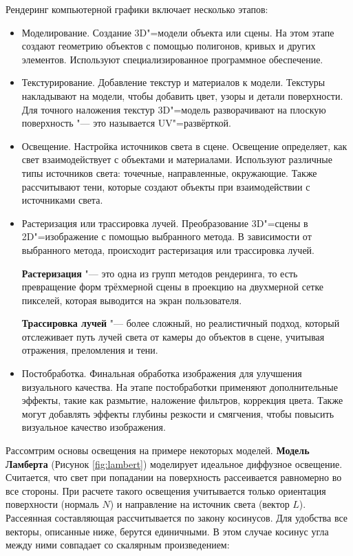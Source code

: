 Рендеринг компьютерной графики включает несколько этапов: 
\begin{itemize}
    \item Моделирование. Создание 3D"=модели объекта или сцены. На этом этапе создают геометрию объектов с помощью полигонов, кривых и других элементов. Используют специализированное программное обеспечение.  
    \item Текстурирование. Добавление текстур и материалов к модели. Текстуры накладывают на модели, чтобы добавить цвет, узоры и детали поверхности. Для точного наложения текстур 3D"=модель разворачивают на плоскую поверхность "--- это называется UV"=развёрткой.
    \item Освещение. Настройка источников света в сцене.  Освещение определяет, как свет взаимодействует с объектами и материалами. Используют различные типы источников света: точечные, направленные, окружающие. Также рассчитывают тени, которые создают объекты при взаимодействии с источниками света.  
    \item Растеризация или трассировка лучей. Преобразование 3D"=сцены в 2D"=изображение с помощью выбранного метода. В зависимости от выбранного метода, происходит растеризация или трассировка лучей.  
    
    \textbf{Растеризация} "--- это одна из групп методов рендеринга, то есть превращение форм трёхмерной сцены в проекцию на двухмерной сетке пикселей, которая выводится на экран пользователя. 
    
    \textbf{Трассировка лучей} "--- более сложный, но реалистичный подход, который отслеживает путь лучей света от камеры до объектов в сцене, учитывая отражения, преломления и тени.
    \item Постобработка. Финальная обработка изображения для улучшения визуального качества.  На этапе постобработки применяют дополнительные эффекты, такие как размытие, наложение фильтров, коррекция цвета. Также могут добавлять эффекты глубины резкости и смягчения, чтобы повысить визуальное качество изображения.
\end{itemize}

Рассомтрим основы освещения на примере некоторых моделей. \textbf{Модель Ламберта} (Рисунок \ref{fig:lambert}) моделирует идеальное диффузное освещение. Считается, что свет при попадании на поверхность рассеивается равномерно во все стороны. При расчете такого освещения учитывается только ориентация поверхности (нормаль $N$) и направление на источник света (вектор $L$). Рассеянная составляющая рассчитывается по закону косинусов. Для удобства все векторы, описанные ниже, берутся единичными. В этом случае косинус угла между ними совпадает со скалярным произведением\cite{light_models}:

